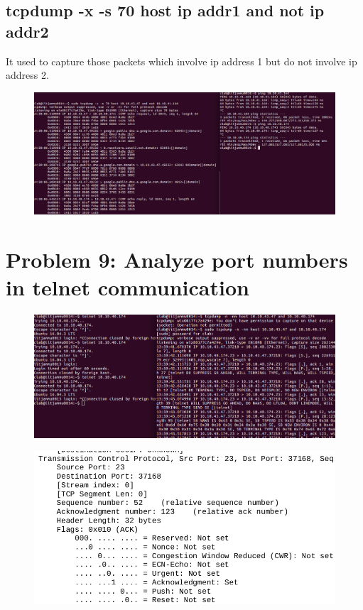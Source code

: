 \documentclass[]{report}
\begin{document}
\subsection{tcpdump -x -s 70 host ip addr1 and not ip addr2}
It used to capture those packets which involve ip address 1 but do not involve ip address 2. 
\begin{figure}[H]
	\vspace{0pt}
	\includegraphics[width=600pt, keepaspectratio, center]{Snapshots/exe8/q8_4.png}
\end{figure} 
\section{Problem 9: Analyze port numbers in telnet communication}
\begin{figure}[H]
	\vspace{0pt}
	\includegraphics[width=600pt, keepaspectratio, center]{Snapshots/exe9/q9.png}
\end{figure} 
\begin{figure}[H]
	\vspace{0pt}
	\includegraphics[width=600pt, keepaspectratio, center]{Snapshots/exe9/ports.png}
\end{figure} 
\end{document}
